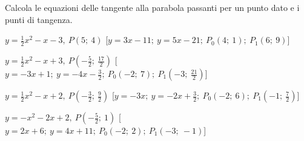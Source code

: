 \begin{esercizio}\label{ese:}
 Calcola le equazioni delle tangente alla parabola passanti per un punto 
 dato e i punti di tangenza.
 \begin{enumeratea}
  \item  \(y=\frac{1}{2} x^2 - x -3,~P \left (5;~4 \right )\)
   \hfill [\(y = 3 x -11;~y = 5 x -21;~P_0 \left (4;~1 \right );~P_1 \left (6;~9 \right )\)]
  \item  \(y=\frac{1}{2} x^2 - x +3,~P \left (-\frac{5}{2};~\frac{17}{2} \right )\)
   \hfill [\(y = -3 x +1;~y = -4 x -\frac{3}{2};~P_0 \left (-2;~7 \right );~P_1 \left (-3;~\frac{21}{2} \right )\)]
  \item  \(y=\frac{1}{2} x^2 - x +2,~P \left (-\frac{3}{2};~\frac{9}{2} \right )\)
   \hfill [\(y = -3 x ;~y = -2 x +\frac{3}{2};~P_0 \left (-2;~6 \right );~P_1 \left (-1;~\frac{7}{2} \right )\)]
  \item  \(y=- x^2 -2 x +2,~P \left (-\frac{5}{2};~1 \right )\)
   \hfill [\(y = 2 x +6;~y = 4 x +11;~P_0 \left (-2;~2 \right );~P_1 \left (-3;~-1 \right )\)]

\end{enumeratea}
\end{esercizio}

